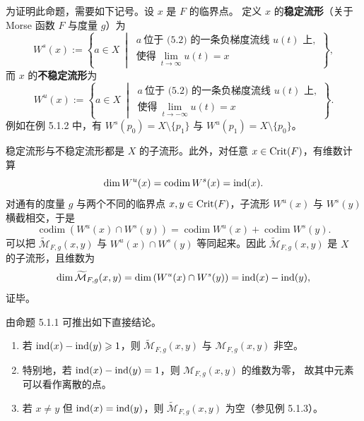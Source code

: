 为证明此命题，需要如下记号。设 $x$ 是 $F$ 的临界点。
定义 $x$ 的\textbf{稳定流形}（关于 Morse 函数 $F$ 与度量 $g$）为
\[
W^s(x):=\left\{a\in X\ \middle|\
\begin{array}{l}
a\ \text{位于 (5.2) 的一条负梯度流线 }u(t)\text{ 上},\\
\text{使得}\ \lim_{t\to\infty}u(t)=x
\end{array}\right\},
\]
而 $x$ 的\textbf{不稳定流形}为
\[
W^u(x):=\left\{a\in X\ \middle|\
\begin{array}{l}
a\ \text{位于 (5.2) 的一条负梯度流线 }u(t)\text{ 上},\\
\text{使得}\ \lim_{t\to-\infty}u(t)=x
\end{array}\right\}.
\]
例如在例 5.1.2 中，有 $W^s(p_0)=X\setminus\{p_1\}$ 与
$W^u(p_1)=X\setminus\{p_0\}$。

\begin{wproof}[命题 5.1.1 的证明（略证）]
稳定流形与不稳定流形都是 $X$ 的子流形。此外，对任意 $x\in\operatorname{Crit}(F)$，有维数计算
\[
\dim W^u(x)=\operatorname{codim}W^s(x)=\operatorname{ind}(x).
\]
对通有的度量 $g$ 与两个不同的临界点 $x,y\in\operatorname{Crit}(F)$，子流形 $W^u(x)$ 与
$W^s(y)$ 横截相交，于是
\[
\operatorname{codim}\left(W^u(x)\cap W^s(y)\right)
=\operatorname{codim}W^u(x)+\operatorname{codim}W^s(y).
\]
可以把 $\widetilde{\mathcal M}_{F,g}(x,y)$ 与 $W^u(x)\cap W^s(y)$ 等同起来。因此
$\widetilde{\mathcal M}_{F,g}(x,y)$ 是 $X$ 的子流形，且维数为
\[
\dim\widetilde{\mathcal M}_{F,g}(x,y)
=\dim\left(W^u(x)\cap W^s(y)\right)=\operatorname{ind}(x)-\operatorname{ind}(y),
\]
证毕。
\end{wproof}


由命题 5.1.1 可推出如下直接结论。
\begin{enumerate}[label=(\roman*)]
  \item 若 $\operatorname{ind}(x)-\operatorname{ind}(y)\geqslant1$，则 $\widetilde{\mathcal M}_{F,g}(x,y)$ 与
        $\mathcal M_{F,g}(x,y)$ 非空。
  \item 特别地，若 $\operatorname{ind}(x)-\operatorname{ind}(y)=1$，则 $\mathcal M_{F,g}(x,y)$ 的维数为零，
        故其中元素可以看作离散的点。
  \item 若 $x\ne y$ 但 $\operatorname{ind}(x)=\operatorname{ind}(y)$，则 $\widetilde{\mathcal M}_{F,g}(x,y)$
        为空（参见例 5.1.3）。
\end{enumerate}

